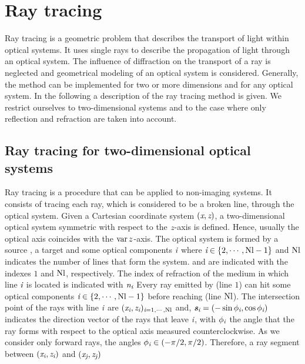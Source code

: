 \chapter{Ray tracing}\label{chap:raytracing}
Ray tracing is a geometric problem that describes the transport of light within optical systems.
It uses single rays to describe the propagation of light through an optical system.
The influence of diffraction on the transport of a ray is neglected and geometrical modeling of an optical system is considered.
Generally, the method can be implemented for two or more dimensions and for any optical system.
In the following a description of the ray tracing method is given. We restrict ourselves to two-dimensional systems and to the case where only reflection and refraction are taken into account.
\section{Ray tracing for two-dimensional optical systems}
Ray tracing is a procedure that can be applied to non-imaging systems. It consists of tracing each ray, which is considered to be a broken line, through the optical system.
Given a Cartesian coordinate system $(\textit{x}, \textit{z})$, a two-dimensional optical system symmetric with respect to the $\textit{z}$-axis is defined. 
Hence, usually the optical axis coincides with the $\operatorname{var}{z}$-axis. 
The optical system is formed by a source , a target   and some optical components $\textit{i}$ where $\textit{i} \in \{2, \cdots, \textrm{Nl}-1\}$ and $\textrm{Nl}$
 indicates the number of lines that form the system.  and  are indicated with the indexes $1$ and $\textrm{Nl}$, respectively. 
The index of refraction of the medium in which line $\textit{i}$ is located is indicated with $\textit{n}_{\textit{i}}$
Every ray emitted by  (line $1$) can hit some optical components $\textit{i}\in\{2, \cdots, \textrm{Nl} -1\}$ before reaching  (line $\textrm{Nl}$). 
The intersection point of the rays with line $\textit{i}$ are $(\textit{x}_{\textit{i}}, \textit{z}_{\textit{i}})_{\textit{i} =1, \cdots, \textrm{Nl}}$ and, $\textit{\textbf{s}}_{\textit{i}}= (-\sin \phi_{\textit{i}}, \cos \phi_{\textit{i}})$ indicates the direction vector of the rays that leave $\textit{i}$,
with $\phi_{\textit{i}}$ the angle that the ray forms with respect to the optical axis measured counterclockwise. As we consider only forward rays, the angles 
$\phi_{\textit{i}}\in (-\pi/2, \pi/2)$.
Therefore, a ray segment between $(\textit{x}_{\textit{i}}, \textit{z}_{\textit{i}})$ and $(\textit{x}_{\textit{j}}, \textit{z}_{\textit{j}})$ 
